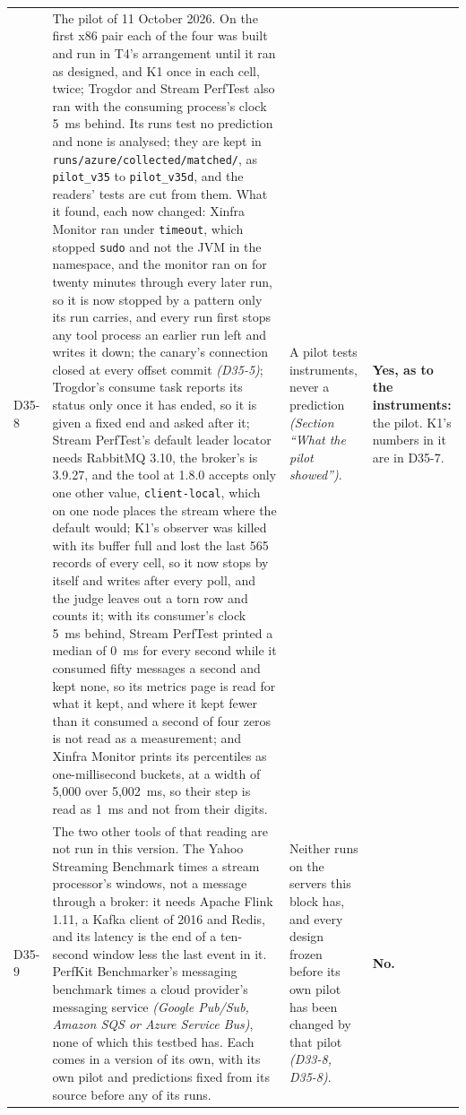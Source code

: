 \documentclass[11pt]{article}
\newcommand{\gl}[1]{{\color{soft}\itshape\small (#1)}}
\begin{document}
{\begin{longtable}{@{}p{1.1cm} >{\raggedright\arraybackslash}p{6.1cm} >{\raggedright\arraybackslash}p{6.0cm} >{\raggedright\arraybackslash}p{2.2cm}@{}}
D35-8 & The pilot of 11 October 2026. On the first x86 pair each of the four was built and run in T4's arrangement until it ran as designed, and K1 once in each cell, twice; Trogdor and Stream PerfTest also ran with the consuming process's clock 5~ms behind. Its runs test no prediction and none is analysed; they are kept in \texttt{runs/azure/collected/matched/}, as \texttt{pilot\_v35} to \texttt{pilot\_v35d}, and the readers' tests are cut from them. What it found, each now changed: Xinfra Monitor ran under \texttt{timeout}, which stopped \texttt{sudo} and not the JVM in the namespace, and the monitor ran on for twenty minutes through every later run, so it is now stopped by a pattern only its run carries, and every run first stops any tool process an earlier run left and writes it down; the canary's connection closed at every offset commit \gl{D35-5}; Trogdor's consume task reports its status only once it has ended, so it is given a fixed end and asked after it; Stream PerfTest's default leader locator needs RabbitMQ 3.10, the broker's is 3.9.27, and the tool at 1.8.0 accepts only one other value, \texttt{client-local}, which on one node places the stream where the default would; K1's observer was killed with its buffer full and lost the last 565 records of every cell, so it now stops by itself and writes after every poll, and the judge leaves out a torn row and counts it; with its consumer's clock 5~ms behind, Stream PerfTest printed a median of 0~ms for every second while it consumed fifty messages a second and kept none, so its metrics page is read for what it kept, and where it kept fewer than it consumed a second of four zeros is not read as a measurement; and Xinfra Monitor prints its percentiles as one-millisecond buckets, at a width of 5,000 over 5,002~ms, so their step is read as 1~ms and not from their digits. & A pilot tests instruments, never a prediction \gl{Section ``What the pilot showed''}. & \textbf{Yes, as to the instruments:} the pilot. K1's numbers in it are in D35-7. \\
D35-9 & The two other tools of that reading are not run in this version. The Yahoo Streaming Benchmark times a stream processor's windows, not a message through a broker: it needs Apache Flink 1.11, a Kafka client of 2016 and Redis, and its latency is the end of a ten-second window less the last event in it. PerfKit Benchmarker's messaging benchmark times a cloud provider's messaging service \gl{Google Pub/Sub, Amazon SQS or Azure Service Bus}, none of which this testbed has. Each comes in a version of its own, with its own pilot and predictions fixed from its source before any of its runs. & Neither runs on the servers this block has, and every design frozen before its own pilot has been changed by that pilot \gl{D33-8, D35-8}. & \textbf{No.} \\

\end{longtable}}
\end{document}
